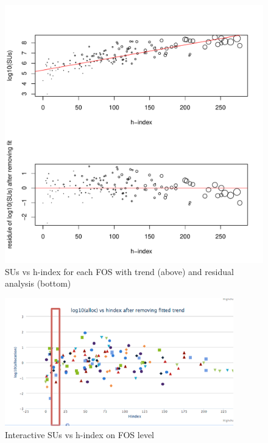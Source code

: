 \documentclass{sig-alternate}
\begin{document}
\begin{figure}[htb] 
  \centering 
    \includegraphics[width=1.0\columnwidth]{images/05_alloc_vs_hindex_fos_sized_2in1.pdf} 
  \caption{SUs vs h-index for each FOS with trend (above) and residual analysis (bottom)}\label{F:alloc-vs-hindex-fos-sized} 
\end{figure} 
 
 
 
\begin{figure}[htb] 
  \centering 
    \includegraphics[width=1.0\columnwidth]{images/fig3.pdf} 
  \caption{Interactive SUs vs h-index on FOS level}\label{F:fig3} 
\end{figure} 
 
\end{document}
